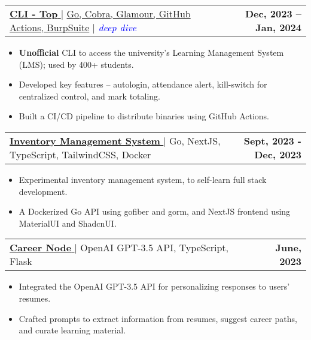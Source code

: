 \documentclass[letterpaper,11pt]{article}
\makeatletter
\newcommand{\uniformunderline}[1]{%
  \uline{\phantom{#1}}%
  \llap{\contour{white}{#1}}%
}
\newcommand{\resumeItem}[1]{
  \item\small{
    {#1 \vspace{-2pt}}
  }
}
\newcommand{\resumeProjectHeading}[2]{
    \item
    \begin{tabular*}{1.001\textwidth}{l@{\extracolsep{\fill}}r}
      \small#1 & \textbf{\small #2}\\
    \end{tabular*}\vspace{-7pt}
}
\newcommand{\resumeItemListStart}{\begin{itemize}}
\newcommand{\resumeItemListEnd}{\end{itemize}\vspace{-5pt}}
\makeatother
\begin{document}
        \resumeProjectHeading
            {\href{https://cli-top.acmvit.in}{\textbf{\large{CLI - Top}} \href{https://cli-top.acmvit.in}{\raisebox{-0.1\height}\faExternalLink }} $|$ \normalsize{\href{https://github.com/ACM-VIT/cli-top}{Go, Cobra, Glamour, GitHub Actions, BurpSuite}} $|$ \textcolor{blue}{\small{\textit{deep dive}}}}{Dec, 2023 -- Jan, 2024}
            \vspace{-11pt}
            \resumeItemListStart
                \resumeItem{\normalsize{\textbf{Unofficial} CLI to access the university's Learning Management System (LMS); used by 400+ students.}} 
                \resumeItem{\normalsize{Developed key features -- autologin, attendance alert, kill-switch for centralized control, and mark totaling.}}
                \resumeItem{\normalsize{Built a CI/CD pipeline to distribute binaries using GitHub Actions.}}
            \resumeItemListEnd
            \vspace{-15pt}
      
        \resumeProjectHeading
            {\href{https://github.com/saharshbhansali/TallyStock}{\textbf{\large{Inventory Management System}} \href{https://github.com/saharshbhansali/TallyStock}{\raisebox{-0.1\height}\faExternalLink }} $|$ \normalsize{Go, NextJS, TypeScript, TailwindCSS, Docker}}{Sept, 2023 - Dec, 2023}
            \vspace{-11pt}
            \resumeItemListStart
                \resumeItem{\normalsize{Experimental inventory management system, to self-learn full stack development.}} 
                \resumeItem{\normalsize{A Dockerized Go API using gofiber and gorm, and NextJS frontend using MaterialUI and ShadcnUI.}} 
            \resumeItemListEnd
            \vspace{-15pt}

        \resumeProjectHeading
            {\href{https://github.com/kaushalrathi24/funtimeError}{\textbf{\large{Career Node}} \href{https://github.com/kaushalrathi24/funtimeError}{\raisebox{-0.1\height}\faExternalLink }} $|$ \normalsize{OpenAI GPT-3.5 API, TypeScript, Flask}}{June, 2023}
            \vspace{-11pt}
            \resumeItemListStart
                \resumeItem{\normalsize{Integrated the OpenAI GPT-3.5 API for personalizing responses to users' resumes.}} 
                \resumeItem{\normalsize{Crafted prompts to extract information from resumes, suggest career paths, and curate learning material.}} 
            \resumeItemListEnd 
            \vspace{-15pt}
\end{document}
